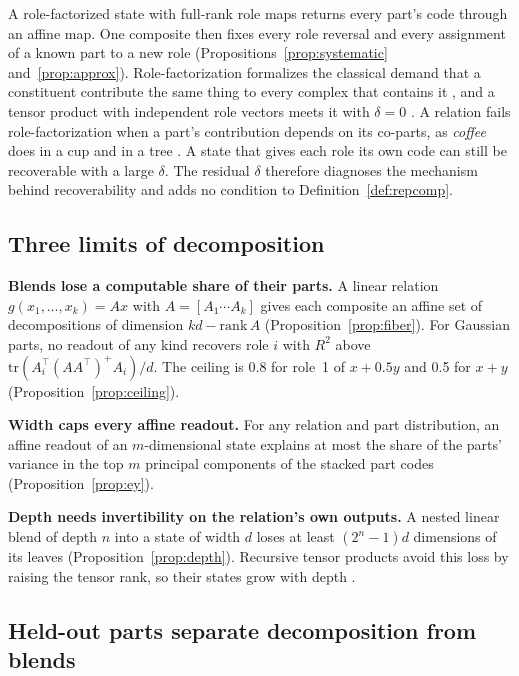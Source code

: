 \documentclass[10pt]{article}
\theoremstyle{plain}
\theoremstyle{remark}
\begin{document}
A role-factorized state with full-rank role maps returns every part's code through an affine map. One composite then fixes every role reversal and every assignment of a known part to a new role (Propositions~\ref{prop:systematic} and~\ref{prop:approx}). Role-factorization formalizes the classical demand that a constituent contribute the same thing to every complex that contains it \citep{fodor1988}, and a tensor product with independent role vectors meets it with $\delta = 0$ \citep{smolensky1990}. A relation fails role-factorization when a part's contribution depends on its co-parts, as \emph{coffee} does in a cup and in a tree \citep{smolensky1988}. A state that gives each role its own code can still be recoverable with a large $\delta$. The residual $\delta$ therefore diagnoses the mechanism behind recoverability and adds no condition to Definition~\ref{def:repcomp}.

\subsection{Three limits of decomposition}
\label{sec:consequences}

\textbf{Blends lose a computable share of their parts.} A linear relation $g(x_1, \ldots, x_k) = A x$ with $A = [A_1 \cdots A_k]$ gives each composite an affine set of decompositions of dimension $kd - \mathrm{rank}\,A$ (Proposition~\ref{prop:fiber}). For Gaussian parts, no readout of any kind recovers role $i$ with $R^2$ above $\mathrm{tr}(A_i^{\top}(AA^{\top})^{+}A_i)/d$. The ceiling is 0.8 for role~1 of $x + 0.5y$ and 0.5 for $x + y$ (Proposition~\ref{prop:ceiling}).

\textbf{Width caps every affine readout.} For any relation and part distribution, an affine readout of an $m$-dimensional state explains at most the share of the parts' variance in the top $m$ principal components of the stacked part codes (Proposition~\ref{prop:ey}).

\textbf{Depth needs invertibility on the relation's own outputs.} A nested linear blend of depth $n$ into a state of width $d$ loses at least $(2^n - 1)d$ dimensions of its leaves (Proposition~\ref{prop:depth}). Recursive tensor products avoid this loss by raising the tensor rank, so their states grow with depth \citep{smolensky1990}.

\subsection{Held-out parts separate decomposition from blends}
\label{sec:calibration}
\end{document}
